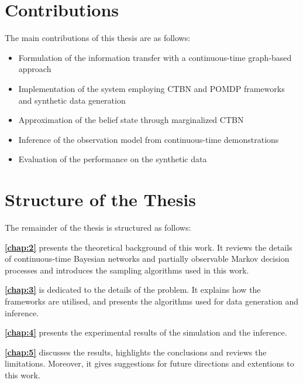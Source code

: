 \section{Contributions}
The main contributions of this thesis are as follows:
\begin{itemize}
	\item Formulation of the information transfer with a continuous-time graph-based approach
	\item Implementation of the system employing CTBN and POMDP frameworks and synthetic data generation
	\item Approximation of the belief state through marginalized CTBN
	\item Inference of the observation model from continuous-time demonstrations
	\item Evaluation of the performance on the synthetic data
\end{itemize}
\section{Structure of the Thesis}
The remainder of the thesis is structured as follows:

\textbf{\cref{chap:2}} presents the theoretical background of this work. It reviews the details of continuous-time Bayesian networks and partially observable Markov decision processes and introduces the sampling algorithms used in this work.

\textbf{\cref{chap:3}} is dedicated to the details of the problem. It explains how the frameworks are utilised, and presents the algorithms used for data generation and inference.

\textbf{\cref{chap:4}} presents the experimental results of the simulation and the inference.

\textbf{\cref{chap:5}} discusses the results, highlights the conclusions and reviews the limitations. Moreover, it gives suggestions for future directions and extentions to this work.